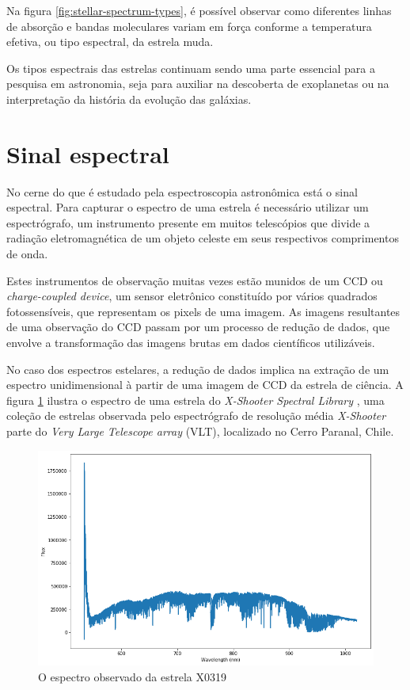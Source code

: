 Na figura \ref{fig:stellar-spectrum-types}, é possível observar como diferentes linhas de absorção e bandas moleculares variam em força conforme a temperatura efetiva, ou tipo espectral, da estrela muda.

Os tipos espectrais das estrelas continuam sendo uma parte essencial para a pesquisa em astronomia, seja para auxiliar na descoberta de exoplanetas ou na interpretação da história da evolução das galáxias. 

\section{Sinal espectral}

No cerne do que é estudado pela espectroscopia astronômica está o sinal espectral. Para capturar o espectro de uma estrela é necessário utilizar um espectrógrafo, um instrumento presente em muitos telescópios que divide a radiação eletromagnética de um objeto celeste em seus respectivos comprimentos de onda.

Estes instrumentos de observação muitas vezes estão munidos de um CCD ou \textit{charge-coupled device}, um sensor eletrônico constituído por vários quadrados fotossensíveis, que representam os pixels de uma imagem. As imagens resultantes de uma observação do CCD passam por um processo de redução de dados, que envolve a transformação das imagens brutas em dados científicos utilizáveis.   

No caso dos espectros estelares, a redução de dados implica na extração de um espectro unidimensional à partir de uma imagem de CCD da estrela de ciência. A figura \ref{fig:x0319-obs-spectrum} ilustra o espectro de uma estrela do \textit{X-Shooter Spectral Library} \citep{Chen2014TheXS}, uma coleção de estrelas observada pelo espectrógrafo de resolução média \textit{X-Shooter} parte do \textit{Very Large Telescope array} (VLT), localizado no Cerro Paranal, Chile.  

\begin{figure}[htb]
\centering
\includegraphics[width=15cm]{figuras/X0319_obs_spectrum.png}
\caption{O espectro observado da estrela X0319}
\label{fig:x0319-obs-spectrum}
\end{figure}

